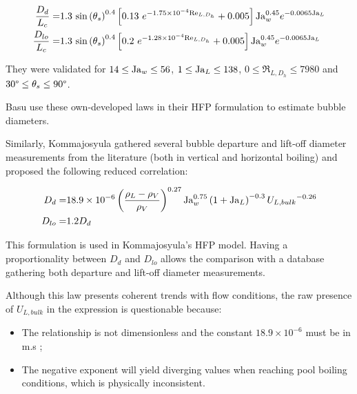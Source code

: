 \begin{align}
\frac{D_{d}}{L_{c}} =& 1.3~\sin{\theta_{s}}^{0.4}\crocht{ 0.13\ e^{-1.75\times 10^{-4} \Re_{L,D_{h}}}+0.005 }\Ja_{w}^{0.45}e^{-0.0065\Ja_{L}}
\label{eq:dd_basu}\\
%
\frac{D_{lo}}{L_{c}} =& 1.3~ \sin{\theta_{s}}^{0.4}\crocht{ 0.2\ e^{-1.28\times 10^{-4} \Re_{L,D_{h}}}+0.005 }\Ja_{w}^{0.45}e^{-0.0065\Ja_{L}}
\label{eq:dlo_basu}
\end{align}

They were validated for $14 \leq \mathrm{Ja}_{w} \leq 56$, $1 \leq \mathrm{Ja}_{L} \leq 138$, $0\leq \Re_{L,D_{h}} \leq 7980$ and $30\degree \leq \theta_{s} \leq 90 \degree$.


\begin{note*}{}
Basu \etal use these own-developed laws in their HFP formulation to estimate bubble diameters.
\end{note*}

\npar

Similarly, Kommajosyula\cite{kommajosyula_development_2020} gathered several bubble departure and lift-off diameter measurements from the literature (both in vertical and horizontal boiling) and proposed the following reduced correlation:

\begin{align}
D_{d} =& 18.9 \times 10^{-6} \left( \frac{\rho_{L}-\rho_{V}}{\rho_{V}} \right)^{0.27} \mathrm{Ja}_{w}^{0.75} \left( 1+\mathrm{Ja}_{L} \right)^{-0.3} {U_{L,bulk}}^{-0.26}
\label{eq:dd_komma} \\
D_{lo} =& 1.2 D_{d}
\label{eq:dlo_komma}
\end{align}

\begin{note*}{}
This formulation is used in Kommajosyula's HFP model. Having a proportionality between $D_{d}$ and $D_{lo}$ allows the comparison with a database gathering both departure and lift-off diameter measurements.
\end{note*}

Although this law presents coherent trends with flow conditions, the raw presence of $U_{L,bulk}$ in the expression is questionable because:

\begin{itemize}
\item The relationship is not dimensionless and the constant $18.9 \times 10^{-6}$ must be in m.s ;
\item The negative exponent will yield diverging values when reaching pool boiling conditions, which is physically inconsistent.
\end{itemize}


